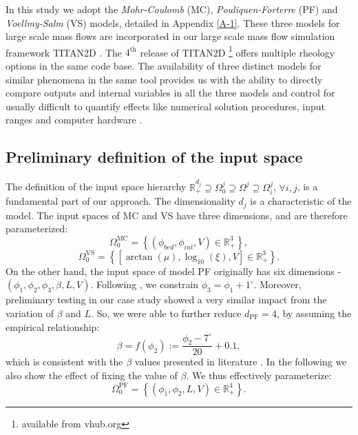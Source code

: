 \documentclass[nhess, manuscript]{copernicus}
\begin{document}
In this study we adopt the \emph{Mohr-Coulomb} (MC), \emph{Pouliquen-Forterre} (PF) and \emph{Voellmy-Salm} (VS) models, detailed in Appendix  \ref{A-1}. These three models for large scale mass flows are incorporated in our large scale mass flow simulation framework  TITAN2D \citep{Patra2005}. The $\mathrm{4^{\mathrm{th}}}$ release of TITAN2D \footnote{available from vhub.org} offers multiple rheology options in the same code base. The availability of three distinct models for similar phenomena in the same tool provides us with the ability to directly compare  outputs and internal variables in all the three models and control for usually difficult to quantify effects like numerical solution procedures, input ranges and computer hardware \citep{Patra2018}.

\subsection{Preliminary definition of the input space}\label{sub2.1}
The definition of the input space hierarchy $\mathbb R_+^{d_j}\supseteq\Omega_0^j\supseteq\Omega^j\supseteq\Omega^j_i$, $\forall i,j$, is a fundamental part of our approach. The dimensionality $d_j$ is a characteristic of the model. The input spaces of MC and VS have three dimensions, and are therefore parameterized:
$$\Omega_0^{\mathrm{MC}} = \left\{(\phi_{bed}, \phi_{int}, V)\in \mathbb R_+^3\right\},$$
$$\Omega_0^{\mathrm{VS}} = \left\{\left[\arctan(\mu),\log_{10}(\xi),V\right]\in \mathbb R_+^3\right\}.$$
On the other hand, the input space of model PF originally has six dimensions - $(\phi_1, \phi_2, \phi_3, \beta, L, V)$. Following \cite{PouliquenForterre2002}, we constrain $\phi_3=\phi_1+1^\mathrm{\circ}$. Moreover, preliminary testing in our case study showed a very similar impact from the variation of $\beta$ and $L$. So, we were able to further reduce $d_{\mathrm{PF}}=4$, by assuming the empirical relationship:
\begin{equation}
\beta=f(\phi_2):=\frac{\phi_2 - 7^\circ}{20} + 0.1,
\end{equation}
which is  consistent with the $\beta$ values presented in literature \citep{PouliquenForterre2002, ForterrePouliquen2003}. In the following we also show the effect of fixing the value of $\beta$. We thus effectively parameterize:
$$\Omega_0^{\mathrm{PF}} = \left\{(\phi_1, \phi_2, L, V)\in \mathbb R_+^4\right\}.$$
\end{document}
